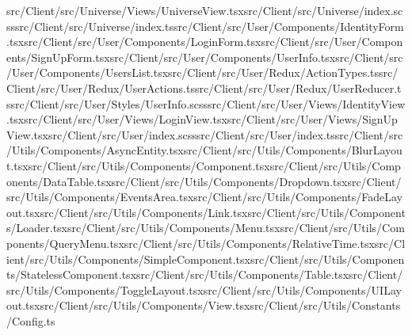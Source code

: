 \documentclass[a4paper,12pt]{article}
\begin{document}
src/Client/src/Universe/Views/UniverseView.tsx\newline src/Client/src/Universe/index.scss\newline src/Client/src/Universe/index.ts\newline src/Client/src/User/Components/IdentityForm.tsx\newline src/Client/src/User/Components/LoginForm.tsx\newline src/Client/src/User/Components/SignUpForm.tsx\newline src/Client/src/User/Components/UserInfo.tsx\newline src/Client/src/User/Components/UsersList.tsx\newline src/Client/src/User/Redux/ActionTypes.ts\newline src/Client/src/User/Redux/UserActions.ts\newline src/Client/src/User/Redux/UserReducer.ts\newline src/Client/src/User/Styles/UserInfo.scss\newline src/Client/src/User/Views/IdentityView.tsx\newline src/Client/src/User/Views/LoginView.tsx\newline src/Client/src/User/Views/SignUpView.tsx\newline src/Client/src/User/index.scss\newline src/Client/src/User/index.ts\newline src/Client/src/Utils/Components/AsyncEntity.tsx\newline src/Client/src/Utils/Components/BlurLayout.tsx\newline src/Client/src/Utils/Components/Component.tsx\newline src/Client/src/Utils/Components/DataTable.tsx\newline src/Client/src/Utils/Components/Dropdown.tsx\newline src/Client/src/Utils/Components/EventsArea.tsx\newline src/Client/src/Utils/Components/FadeLayout.tsx\newline src/Client/src/Utils/Components/Link.tsx\newline src/Client/src/Utils/Components/Loader.tsx\newline src/Client/src/Utils/Components/Menu.tsx\newline src/Client/src/Utils/Components/QueryMenu.tsx\newline src/Client/src/Utils/Components/RelativeTime.tsx\newline src/Client/src/Utils/Components/SimpleComponent.tsx\newline src/Client/src/Utils/Components/StatelessComponent.tsx\newline src/Client/src/Utils/Components/Table.tsx\newline src/Client/src/Utils/Components/ToggleLayout.tsx\newline src/Client/src/Utils/Components/UILayout.tsx\newline src/Client/src/Utils/Components/View.tsx\newline src/Client/src/Utils/Constants/Config.ts\newline 
\end{document}
